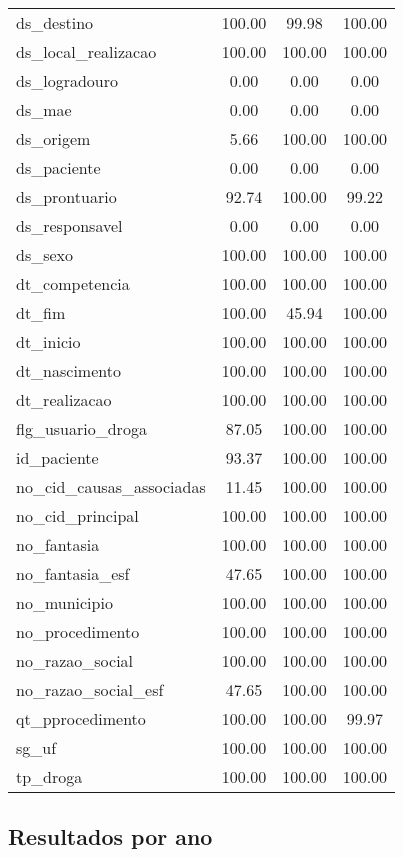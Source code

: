 \documentclass[
  12,
  table]{proadi}
\begin{document}
\begin{longtable}{lccc}
ds\_destino & 100.00 & 99.98 & 100.00\\
\addlinespace
ds\_local\_realizacao & 100.00 & 100.00 & 100.00\\
ds\_logradouro & 0.00 & 0.00 & 0.00\\
ds\_mae & 0.00 & 0.00 & 0.00\\
ds\_origem & 5.66 & 100.00 & 100.00\\
ds\_paciente & 0.00 & 0.00 & 0.00\\
\addlinespace
ds\_prontuario & 92.74 & 100.00 & 99.22\\
ds\_responsavel & 0.00 & 0.00 & 0.00\\
ds\_sexo & 100.00 & 100.00 & 100.00\\
dt\_competencia & 100.00 & 100.00 & 100.00\\
dt\_fim & 100.00 & 45.94 & 100.00\\
\addlinespace
dt\_inicio & 100.00 & 100.00 & 100.00\\
dt\_nascimento & 100.00 & 100.00 & 100.00\\
dt\_realizacao & 100.00 & 100.00 & 100.00\\
flg\_usuario\_droga & 87.05 & 100.00 & 100.00\\
id\_paciente & 93.37 & 100.00 & 100.00\\
\addlinespace
no\_cid\_causas\_associadas & 11.45 & 100.00 & 100.00\\
no\_cid\_principal & 100.00 & 100.00 & 100.00\\
no\_fantasia & 100.00 & 100.00 & 100.00\\
no\_fantasia\_esf & 47.65 & 100.00 & 100.00\\
no\_municipio & 100.00 & 100.00 & 100.00\\
\addlinespace
no\_procedimento & 100.00 & 100.00 & 100.00\\
no\_razao\_social & 100.00 & 100.00 & 100.00\\
no\_razao\_social\_esf & 47.65 & 100.00 & 100.00\\
qt\_pprocedimento & 100.00 & 100.00 & 99.97\\
sg\_uf & 100.00 & 100.00 & 100.00\\
\addlinespace
tp\_droga & 100.00 & 100.00 & 100.00\\*
\end{longtable}
\endgroup{}

\hypertarget{resultados-por-ano}{%
\subsection*{Resultados por ano}\label{resultados-por-ano}}
\end{document}
